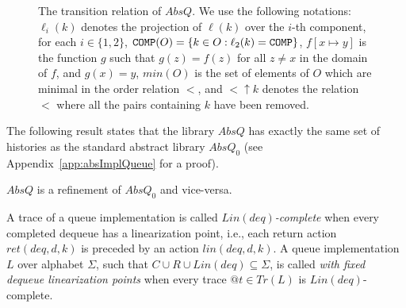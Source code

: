 \begin{figure} [t]
{\begin{mathpar}
    \hspace{5mm}
    \hspace{5mm}    
      \end{mathpar}
  }
 \vspace{-6mm}
  \caption{The transition relation of $AbsQ$. We use the following notations: $\ell_i(k)$ denotes the projection of $\ell(k)$ over the $i$-th component, for each $i\in\{1,2\}$, ${\tt COMP}(O)=\{k\in O: \ell_2(k)={\tt COMP}\}$, $\mathit{f}[x\mapsto y]$ is the function $g$ such that $g(z)=f(z)$ for all $z\neq x$ in the domain of $f$, and $g(x)=y$, $min(O)$ is the set of elements of $O$ which are minimal in the order relation $<$, and $<\uparrow k$ denotes the relation $<$ where all the pairs containing $k$ have been removed.
  }
  \label{fig:transitions:AbsQ}
\vspace{-6mm}
\end{figure}

The following result states that the library $AbsQ$ has exactly the same set of histories as the standard abstract library $AbsQ_0$ (see Appendix~\ref{app:absImplQueue} for a proof).

\vspace{-1.5mm}
\begin{theorem}\label{th:absImplQueue}
$AbsQ$ is a refinement of $AbsQ_0$ and vice-versa.
\vspace{-2mm}
\end{theorem}

A trace of a queue implementation is called \emph{$Lin(deq)$-complete} when every completed dequeue has a linearization point, i.e., each return action $ret(deq,d,k)$ is preceded by an action $lin(deq,d,k)$. A queue implementation $L$ over alphabet $\Sigma$, such that $C\cup R\cup Lin(deq)\subseteq \Sigma$, is called \emph{with fixed dequeue linearization points} when every trace $@t\in Tr(L)$ is $Lin(deq)$-complete.

